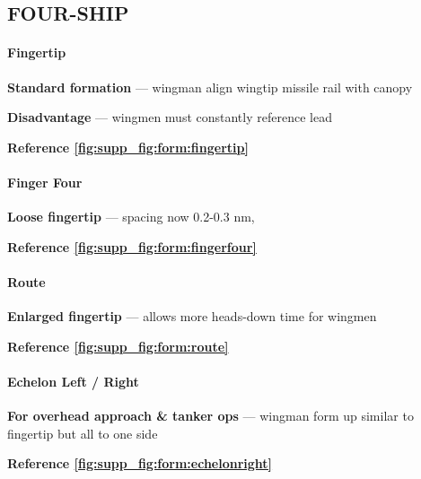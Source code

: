 \subsection{FOUR-SHIP}
\label{subsec:supp_fig:form:4ship}

\paragraph{Fingertip}
\textbf{Standard formation}
--- wingman align wingtip missile rail with canopy

\textbf{Disadvantage} --- wingmen must constantly reference lead

\hfill\textbf{Reference \cref{fig:supp_fig:form:fingertip}}

\paragraph{Finger Four} 
\textbf{Loose fingertip} --- spacing now 0.2-0.3 nm,

\hfill\textbf{Reference \cref{fig:supp_fig:form:fingerfour}}

\paragraph{Route}
\textbf{Enlarged fingertip}
--- allows more heads-down time for wingmen

\hfill\textbf{Reference \cref{fig:supp_fig:form:route}}

\paragraph{Echelon \break Left / Right}
\textbf{For overhead approach \& tanker ops}
--- wingman form up similar to fingertip but all to one side

\hfill\textbf{Reference \cref{fig:supp_fig:form:echelonright}}

